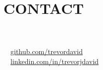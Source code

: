 \section{\large CONTACT}
\faPhone\ \ \textnormal{\myPhone} \\
\faEnvelope\ \ \href{mailto:\myEmail}{\myEmail} \\
\faGithub\ \ \href{https://github.com/trevordavid}{github.com/trevordavid} \\
\faLinkedin\ \ \href{https://www.linkedin.com/in/trevorjdavid/}{linkedin.com/in/trevorjdavid}